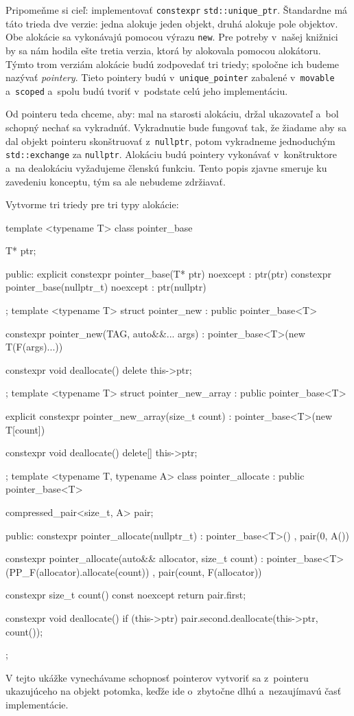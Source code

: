 Pripomeňme si cieľ: implementovať \texttt{constexpr} \texttt{std::unique\_ptr}. Štandardne má táto trieda dve verzie: jedna alokuje jeden objekt, druhá alokuje pole objektov. Obe alokácie sa vykonávajú pomocou výrazu \texttt{new}. Pre potreby v~našej knižnici by sa nám hodila ešte tretia verzia, ktorá by alokovala pomocou alokátoru. Týmto trom verziám alokácie budú zodpovedať tri triedy; spoločne ich budeme nazývať \emph{pointery}. Tieto pointery budú v~\texttt{unique\_pointer} zabalené v~\texttt{movable} a~\texttt{scoped} a~spolu budú tvoriť v~podstate celú jeho implementáciu.

Od pointeru teda chceme, aby: mal na starosti alokáciu, držal ukazovateľ a~bol schopný nechať sa vykradnúť. Vykradnutie bude fungovať tak, že žiadame aby sa dal objekt pointeru skonštruovať z~\texttt{nullptr}, potom vykradneme jednoduchým \texttt{std::exchange} za \texttt{nullptr}. Alokáciu budú pointery vykonávať v~konštruktore a~na dealokáciu vyžadujeme členskú funkciu. Tento popis zjavne smeruje ku zavedeniu konceptu, tým sa ale nebudeme zdržiavať.

Vytvorme tri triedy pre tri typy alokácie:

\begin{code}[fontsize=\footnotesize]
template <typename T>
class pointer_base
{   T* ptr;

public:
    explicit constexpr pointer_base(T* ptr) noexcept : ptr(ptr) {}
    constexpr pointer_base(nullptr_t) noexcept : ptr(nullptr) {}
};
template <typename T>
struct pointer_new : public pointer_base<T>
{   constexpr pointer_new(TAG, auto&&... args)
        : pointer_base<T>(new T(F(args)...)) {}

    constexpr void deallocate() { delete this->ptr; }
};
template <typename T>
struct pointer_new_array : public pointer_base<T>
{   explicit constexpr pointer_new_array(size_t count)
        : pointer_base<T>(new T[count]) {}

    constexpr void deallocate() { delete[] this->ptr; }
};
template <typename T, typename A>
class pointer_allocate : public pointer_base<T>
{   compressed_pair<size_t, A> pair;

public:
    constexpr pointer_allocate(nullptr_t)
        : pointer_base<T>()
        , pair(0, A()) {}

    constexpr pointer_allocate(auto&& allocator, size_t count)
        : pointer_base<T>(PP_F(allocator).allocate(count))
        , pair(count, F(allocator)) {}

    constexpr size_t count() const noexcept { return pair.first; }

    constexpr void deallocate()
    { if (this->ptr) pair.second.deallocate(this->ptr, count()); }
};
\end{code}
V tejto ukážke vynechávame schopnosť pointerov vytvoriť sa z~pointeru ukazujúceho na objekt potomka, keďže ide o~zbytočne dlhú a~nezaujímavú časť implementácie.

